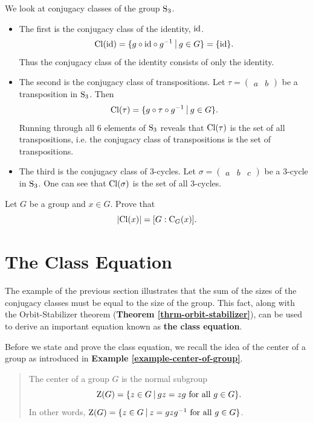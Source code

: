 \begin{example}\label{example-conjugacy-classes-of-Sn3}
    We look at conjugacy classes of the group $\mathrm{S}_{3}$.
    \begin{itemize}
        \item The first is the conjugacy class of the identity, $\mathrm{id}$.
        \[
            \Cl{\id} = \{g\circ\id\circ g^{-1} \vert g \in G \} = \{\id\}.
        \]
        Thus the conjugacy class of the identity consists of only the identity.
        \item The second is the conjugacy class of transpositions. Let $\tau = \begin{pmatrix}a & b\end{pmatrix}$ be a transposition in $\mathrm{S}_{3}$. Then
        \[
            \Cl{\tau} = \{g\circ\tau\circ g^{-1} \vert g \in G\}.
        \]
        Running through all 6 elements of $\mathrm{S}_{3}$ reveals that $\mathrm{Cl}(\tau)$ is the set of all transpositions, i.e. the conjugacy class of transpositions is the set of transpositions.
        \item The third is the conjugacy class of 3-cycles. Let $\sigma = \begin{pmatrix}a & b & c\end{pmatrix}$ be a 3-cycle in $\mathrm{S}_{3}$. One can see that $\mathrm{Cl}(\sigma)$ is the set of all 3-cycles.
    \end{itemize}
\end{example}

\begin{exercise}\label{exercise-order-of-conjugacy-class}
    Let $G$ be a group and $x \in G$. Prove that
    \[
        |\mathrm{Cl}(x)| = [G : \mathrm{C}_{G}(x)].
    \]
\end{exercise}

\section{The Class Equation}
The example of the previous section illustrates that the sum of the sizes of the conjugacy classes must be equal to the size of the group. This fact, along with the Orbit-Stabilizer theorem (\textbf{Theorem \ref{thrm-orbit-stabilizer}}), can be used to derive an important equation known as \textbf{the class equation}.

Before we state and prove the class equation, we recall the idea of the center of a group as introduced in \textbf{Example \ref{example-center-of-group}}.
\begin{quote}
    The center of a group $G$ is the normal subgroup
    \[
        \Z{G} = \{z \in G \vert gz = zg \text{ for all } g \in G\}.
    \]
    In other words, $\Z{G} = \{z \in G \vert z = gzg^{-1} \text{ for all } g \in G\}$.
\end{quote}


